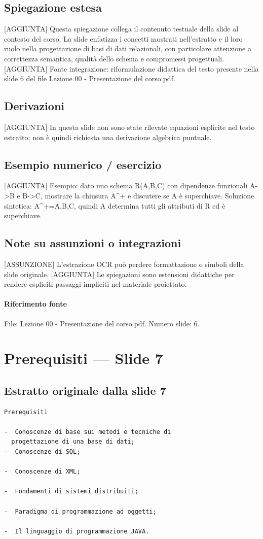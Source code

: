 \documentclass[11pt]{article}
\begin{document}
\subsection*{Spiegazione estesa}
[AGGIUNTA] Questa spiegazione collega il contenuto testuale della slide al contesto del corso. La slide enfatizza i concetti mostrati nell'estratto e il loro ruolo nella progettazione di basi di dati relazionali, con particolare attenzione a correttezza semantica, qualità dello schema e compromessi progettuali.
[AGGIUNTA] Fonte integrazione: riformulazione didattica del testo presente nella slide 6 del file Lezione 00 - Presentazione del corso.pdf.
\subsection*{Derivazioni}
[AGGIUNTA] In questa slide non sono state rilevate equazioni esplicite nel testo estratto; non è quindi richiesta una derivazione algebrica puntuale.
\subsection*{Esempio numerico / esercizio}
[AGGIUNTA] Esempio: dato uno schema R(A,B,C) con dipendenze funzionali A->B e B->C, mostrare la chiusura A^+ e discutere se A è superchiave. Soluzione sintetica: A^+={A,B,C}, quindi A determina tutti gli attributi di R ed è superchiave.
\subsection*{Note su assunzioni o integrazioni}
[ASSUNZIONE] L'estrazione OCR può perdere formattazione o simboli della slide originale.
[AGGIUNTA] Le spiegazioni sono estensioni didattiche per rendere espliciti passaggi impliciti nel materiale proiettato.
\paragraph{Riferimento fonte} File: Lezione 00 - Presentazione del corso.pdf. Numero slide: 6.
\section{Prerequisiti --- Slide 7}
\subsection*{Estratto originale dalla slide 7}
\begin{lstlisting}
Prerequisiti

-  Conoscenze di base sui metodi e tecniche di
  progettazione di una base di dati;
-  Conoscenze di SQL;

-  Conoscenze di XML;

-  Fondamenti di sistemi distribuiti;

-  Paradigma di programmazione ad oggetti;

-  Il linguaggio di programmazione JAVA.
\end{lstlisting}
\end{document}
